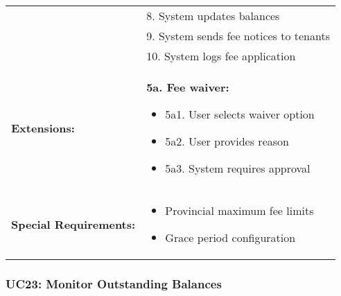 \documentclass[12pt]{article}
\begin{document}
\begin{tabular}{|p{3cm}|p{11cm}|}
& 8. System updates balances \\
& 9. System sends fee notices to tenants \\
& 10. System logs fee application \\
\hline
\textbf{Extensions:} & 
\textbf{5a. Fee waiver:}
\begin{itemize}
    \item 5a1. User selects waiver option
    \item 5a2. User provides reason
    \item 5a3. System requires approval
\end{itemize} \\
\hline
\textbf{Special Requirements:} & 
\begin{itemize}
    \item Provincial maximum fee limits
    \item Grace period configuration
\end{itemize} \\
\hline
\end{tabular}

\subsubsection{UC23: Monitor Outstanding Balances}
\end{document}

